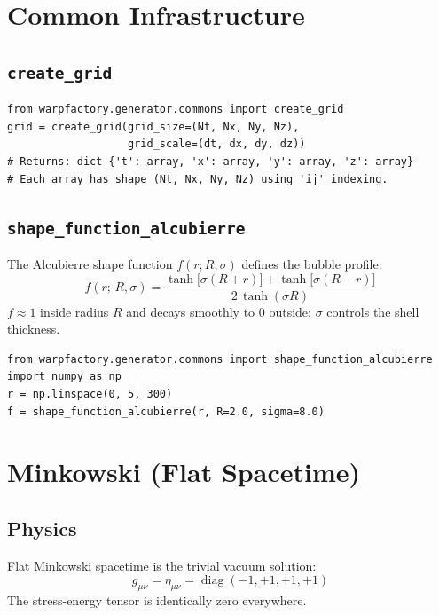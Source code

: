\documentclass[11pt, a4paper, twoside]{report}
\newcommand{\diag}{\operatorname{diag}}
\begin{document}
\section{Common Infrastructure}

\subsection{\texttt{create\_grid}}
\begin{lstlisting}
from warpfactory.generator.commons import create_grid
grid = create_grid(grid_size=(Nt, Nx, Ny, Nz),
                   grid_scale=(dt, dx, dy, dz))
# Returns: dict {'t': array, 'x': array, 'y': array, 'z': array}
# Each array has shape (Nt, Nx, Ny, Nz) using 'ij' indexing.
\end{lstlisting}

\subsection{\texttt{shape\_function\_alcubierre}}
The Alcubierre shape function $f(r; R, \sigma)$ defines the bubble profile:
\begin{equation}
  f(r;\,R,\sigma)
  = \frac{\tanh\!\bigl[\sigma(R+r)\bigr]
         + \tanh\!\bigl[\sigma(R-r)\bigr]}
         {2\,\tanh(\sigma R)}
  \label{eq:shape_fn}
\end{equation}
$f \approx 1$ inside radius $R$ and decays smoothly to $0$ outside;
$\sigma$ controls the shell thickness.

\begin{lstlisting}
from warpfactory.generator.commons import shape_function_alcubierre
import numpy as np
r = np.linspace(0, 5, 300)
f = shape_function_alcubierre(r, R=2.0, sigma=8.0)
\end{lstlisting}

\section{Minkowski (Flat Spacetime)}

\subsection{Physics}

Flat Minkowski spacetime is the trivial vacuum solution:
\begin{equation}
  g_{\mu\nu} = \eta_{\mu\nu} = \diag(-1,+1,+1,+1)
\end{equation}
The stress-energy tensor is identically zero everywhere.
\end{document}
